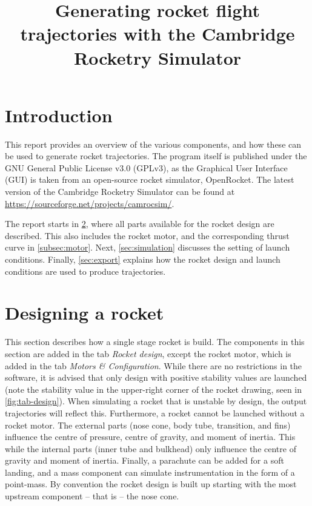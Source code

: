 \documentclass[11pt, a4paper]{article}
\title{Generating rocket flight trajectories with the Cambridge Rocketry Simulator}
\begin{document}
\maketitle


\newpage


\tableofcontents


\newpage


\section{Introduction}




This report provides an overview of the various components, and how these can be used to generate rocket trajectories. The program itself is published under the GNU General Public License v3.0 (GPLv3), as the Graphical User Interface (GUI) is taken from an open-source rocket simulator, OpenRocket. The latest version of the Cambridge Rocketry Simulator can be found at \url{https://sourceforge.net/projects/camrocsim/}.

The report starts in \cref{sec:design}, where all parts available for the rocket design are described. This also includes the rocket motor, and the corresponding thrust curve in \cref{subsec:motor}. Next, \cref{sec:simulation} discusses the setting of launch conditions. Finally, \cref{sec:export} explains how the rocket design and launch conditions are used to produce trajectories. 

%
\section{Designing a rocket} \label{sec:design}


This section describes how a single stage rocket is build. The components in this section are added in the tab \emph{Rocket design}, except the rocket motor, which is added in the tab \emph{Motors \& Configuration}. 
%
While there are no restrictions in the software, it is advised that only design with positive stability values are launched (note the stability value in the upper-right corner of the rocket drawing, seen in \cref{fig:tab-design}). When simulating a rocket that is unstable by design, the output trajectories will reflect this.
%
Furthermore, a rocket cannot be launched without a rocket motor. The external parts (nose cone, body tube, transition, and fins) influence the centre of pressure, centre of gravity, and moment of inertia. This while the internal parts (inner tube and bulkhead) only influence the centre of gravity and moment of inertia. Finally, a parachute can be added for a soft landing, and a mass component can simulate instrumentation in the form of a point-mass.
%
By convention the rocket design is built up starting with the most upstream component -- that is -- the nose cone.
\end{document}
